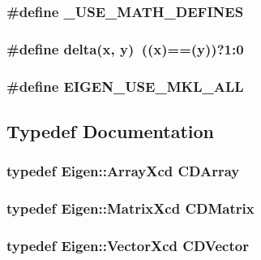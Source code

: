 \subsubsection{\setlength{\rightskip}{0pt plus 5cm}\#define \_\-USE\_\-MATH\_\-DEFINES}\label{types_8h_ec714df39b36686a25a86a2478a1239c}


\subsubsection{\setlength{\rightskip}{0pt plus 5cm}\#define delta(x, y)~((x)==(y))?1:0}\label{types_8h_2cf5e90ef10ca48d573d1b573be6d2f6}


\subsubsection{\setlength{\rightskip}{0pt plus 5cm}\#define EIGEN\_\-USE\_\-MKL\_\-ALL}\label{types_8h_5ad034e312ad8321d34f9e6af4fa162f}




\subsection{Typedef Documentation}
\subsubsection{\setlength{\rightskip}{0pt plus 5cm}typedef Eigen::Array\-Xcd \bf{CDArray}}\label{types_8h_a2066d8f230e4aa544b64a70eb1307e8}


\subsubsection{\setlength{\rightskip}{0pt plus 5cm}typedef Eigen::Matrix\-Xcd \bf{CDMatrix}}\label{types_8h_faef33e67aa5007ecfd81e470e5fcf05}


\subsubsection{\setlength{\rightskip}{0pt plus 5cm}typedef Eigen::Vector\-Xcd \bf{CDVector}}\label{types_8h_bc4f0e198f8f06e1a4082f8ad2afba01}


